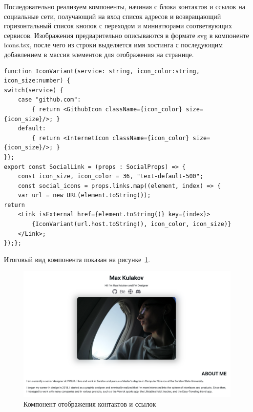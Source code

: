 \documentclass[master, och, diploma]{SCWorks}
\begin{document}
Последовательно реализуем компоненты, начиная с блока контактов и ссылок на социальные сети, получающий на вход список адресов и возвращающий горизонтальный список кнопок с переходом и миниатюрами соответвующих сервисов. Изображения предварительно описываются в формате svg в компоненте icons.tsx, после чего из строки выделяется имя хостинга с последующим добавлением в массив элементов для отображения на странице.
\begin{verbatim}
function IconVariant(service: string, icon_color:string, icon_size:number) {
switch(service) { 
    case "github.com": 
        { return <GithubIcon className={icon_color} size={icon_size}/>; } 
    default: 
        { return <InternetIcon className={icon_color} size={icon_size}/>; }
}};
export const SocialLink = (props : SocialProps) => {
    const icon_size, icon_color = 36, "text-default-500";
    const social_icons = props.links.map((element, index) => {
    var url = new URL(element.toString());
return 	
    <Link isExternal href={element.toString()} key={index}>
        {IconVariant(url.host.toString(), icon_color, icon_size)}
    </Link>;
});};
\end{verbatim}

Итоговый вид компонента показан на рисунке~\ref{fig:25}. 
\begin{figure}[!ht]
    \centering
    \includegraphics[width=12cm]{images/image-resume-1.png}
    \caption{\label{fig:25}%
        Компонент отображения контактов и ссылок}
\end{figure}
\end{document}
